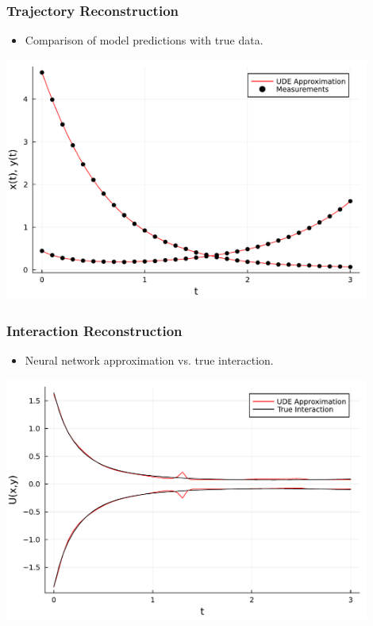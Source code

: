 \documentclass[aspectratio=169]{beamer}
\begin{document}
\begin{frame}
  \frametitle{Trajectory Reconstruction}
  \begin{itemize}
    \item Comparison of model predictions with true data.
  \end{itemize}
  \includegraphics[width=12cm]{plots/Ideal_Data__trajectory_reconstruction.pdf}
\end{frame}

\begin{frame}
  \frametitle{Interaction Reconstruction}
  \begin{itemize}
    \item Neural network approximation vs. true interaction.
  \end{itemize}
  \includegraphics[width=12cm]{plots/Ideal_Data__missingterm_reconstruction.pdf}
\end{frame}
\end{document}

